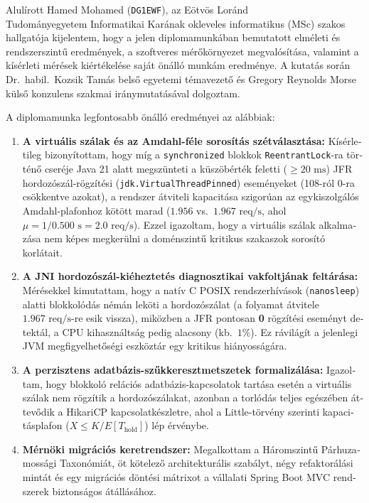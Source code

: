 \begin{otherlanguage}{magyar}
Alulírott Hamed Mohamed (\texttt{DG1EWF}), az Eötvös Loránd\\
Tudományegyetem Informatikai Karának okleveles informatikus (MSc) szakos hallgatója kijelentem, hogy a jelen diplomamunkában bemutatott elméleti és rendszerszintű eredmények, a szoftveres mérőkörnyezet megvalósítása, valamint a kísérleti mérések kiértékelése saját önálló munkám eredménye. A kutatás során Dr.~habil.\ Kozsik Tamás belső egyetemi témavezető és Gregory Reynolds Morse külső konzulens szakmai iránymutatásával dolgoztam.

A diplomamunka legfontosabb önálló eredményei az alábbiak:
\begin{enumerate}
  \item \textbf{A virtuális szálak és az Amdahl-féle sorosítás szétválasztása:} Kísérletileg bizonyítottam, hogy míg a \texttt{synchronized} blokkok \texttt{ReentrantLock}-ra történő cseréje Java 21 alatt megszünteti a küszöbérték feletti ($\ge 20\text{ ms}$) JFR hordozószál-rögzítési (\texttt{jdk.VirtualThreadPinned}) eseményeket (108-ról 0-ra csökkentve azokat), a rendszer átviteli kapacitása szigorúan az egykiszolgálós Amdahl-plafonhoz kötött marad ($1.956$ vs.\ $1.967\text{ req/s}$, ahol $\mu = 1/0.500\text{ s} = 2.0\text{ req/s}$). Ezzel igazoltam, hogy a virtuális szálak alkalmazása nem képes megkerülni a doménszintű kritikus szakaszok sorosító korlátait.
  \item \textbf{A JNI hordozószál-kiéheztetés diagnosztikai vakfoltjának feltárása:} Mérésekkel kimutattam, hogy a natív C POSIX rendszerhívások (\texttt{nanosleep}) alatti blokkolódás némán leköti a hordozószálat (a folyamat átvitele $1.967\text{ req/s}$-re esik vissza), miközben a JFR pontosan \textbf{0} rögzítési eseményt detektál, a CPU kihasználtság pedig alacsony (kb.~$1\%$). Ez rávilágít a jelenlegi JVM megfigyelhetőségi eszköztár egy kritikus hiányosságára.
  \item \textbf{A perzisztens adatbázis-szűkkeresztmetszetek formalizálása:} Igazoltam, hogy blokkoló relációs adatbázis-kapcsolatok tartása esetén a virtuális szálak nem rögzítik a hordozószálakat, azonban a torlódás teljes egészében áttevődik a HikariCP kapcsolatkészletre, ahol a Little-törvény szerinti kapacitásplafon ($X \le K / E[T_{\text{hold}}]$) lép érvénybe.
  \item \textbf{Mérnöki migrációs keretrendszer:} Megalkottam a Háromszintű Párhuzamossági Taxonómiát, öt kötelező architekturális szabályt, négy refaktorálási mintát és egy migrációs döntési mátrixot a vállalati Spring Boot MVC rendszerek biztonságos átállásához.
\end{enumerate}
\end{otherlanguage}

